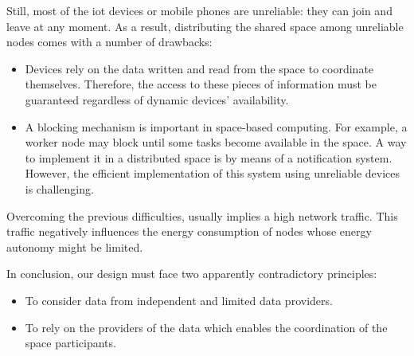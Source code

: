 Still, most of the \ac{iot} devices or mobile phones are unreliable: they can join and leave at any moment.
As a result, distributing the shared space among unreliable nodes comes with a number of drawbacks:
\begin{itemize}
  \item Devices rely on the data written and read from the space to coordinate themselves.
	Therefore, the access to these pieces of information must be guaranteed regardless of dynamic devices' availability. %
  \item A blocking mechanism is important in space-based computing. 
        For example, a worker node may block until some tasks become available in the space.
        A way to implement it in a distributed space is by means of a notification system.
        However, the efficient implementation of this system using unreliable devices is challenging. %
\end{itemize}
Overcoming the previous difficulties, usually implies a high network traffic.
This traffic negatively influences the energy consumption of nodes whose energy autonomy might be limited.

\bigskip

In conclusion, our design must face two apparently contradictory principles:
\begin{itemize}
  \item To consider data from independent and limited data providers.
  \item To rely on the providers of the data which enables the coordination of the space participants.
\end{itemize}